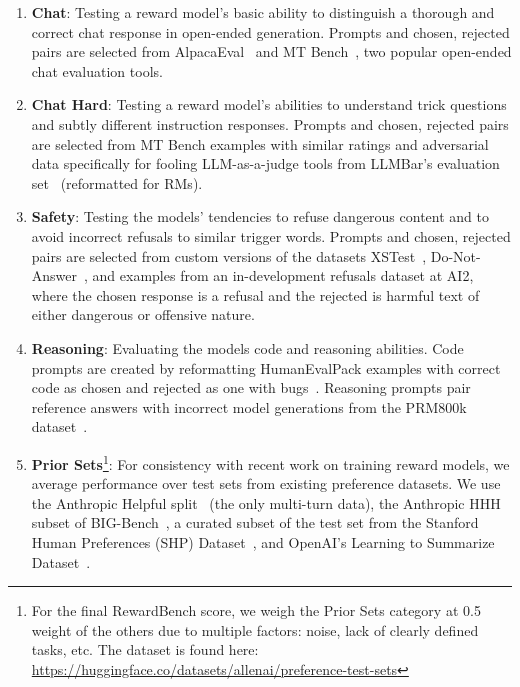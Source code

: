 \begin{enumerate}[leftmargin=0.5cm]
    \item \textbf{Chat}: Testing a reward model's basic ability to distinguish a thorough and correct chat response in open-ended generation.
    Prompts and chosen, rejected pairs are selected from AlpacaEval~\citep{alpaca_eval} and MT Bench~\citep{zheng2023judging}, two popular open-ended chat evaluation tools. 
    \item \textbf{Chat Hard}: Testing a reward model's abilities to understand trick questions and subtly different instruction responses. 
    Prompts and chosen, rejected pairs are selected from MT Bench examples with similar ratings and adversarial data specifically for fooling LLM-as-a-judge tools from LLMBar's evaluation set~\citep{zeng2023llmbar} (reformatted for RMs).
    \item \textbf{Safety}: Testing the models' tendencies to refuse dangerous content and to avoid incorrect refusals to similar trigger words. 
    Prompts and chosen, rejected pairs are selected from custom versions of the datasets XSTest~\citep{rottger2023xstest}, Do-Not-Answer~\citep{wang2023donotanswer}, and examples from an in-development refusals dataset at AI2, where the chosen response is a refusal and the rejected is harmful text of either dangerous or offensive nature.
    \item \textbf{Reasoning}: Evaluating the models code and reasoning abilities. 
    Code prompts are created by reformatting HumanEvalPack examples with correct code as chosen and rejected as one with bugs~\citep{muennighoff2023octopack}.
    Reasoning prompts pair reference answers with incorrect model generations from the PRM800k dataset~\citep{lightman2023let}.
    
    

    \item \textbf{Prior Sets}\footnote{For the final RewardBench score, we weigh the Prior Sets category at 0.5 weight of the others due to multiple factors: noise, lack of clearly defined tasks, etc. The dataset is found here: \url{https://huggingface.co/datasets/allenai/preference-test-sets} }: For consistency with recent work on training reward models, we average performance over test sets from existing preference datasets.
    We use the Anthropic Helpful split~\citep{bai2022training} (the only multi-turn data), the Anthropic HHH subset of BIG-Bench~\citep{askell2021general}, a curated subset of the test set from the Stanford Human Preferences (SHP) Dataset~\citep{pmlr-v162-ethayarajh22a}, and OpenAI's Learning to Summarize Dataset~\citep{stiennon2020learning}.
\end{enumerate}




